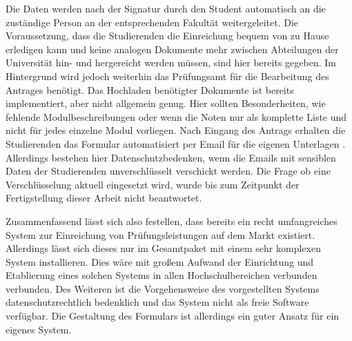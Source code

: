 Die Daten werden nach der Signatur durch den Student automatisch an die zuständige Person an der entsprechenden Fakultät weitergeleitet. Die Voraussetzung, dass die Studierenden die Einreichung bequem von zu Hause erledigen kann und keine analogen Dokumente mehr zwischen Abteilungen der Universität hin- und hergereicht werden müssen, sind hier bereits gegeben. Im Hintergrund wird jedoch weiterhin das Prüfungsamt für die Bearbeitung des Antrages benötigt. Das Hochladen benötigter Dokumente ist bereits implementiert, aber nicht allgemein genug. Hier sollten Besonderheiten, wie fehlende Modulbeschreibungen oder wenn die Noten nur als komplette Liste und nicht für jedes einzelne Modul vorliegen. Nach Eingang des Antrags erhalten die Studierenden das Formular automatisiert per Email für die eigenen Unterlagen \parencite{studit_formular}. Allerdings bestehen hier Datenschutzbedenken, wenn die Emails mit sensiblen Daten der Studierenden unverschlüsselt verschickt werden. Die Frage ob eine Verschlüsselung aktuell eingesetzt wird, wurde bis zum Zeitpunkt der Fertigstellung dieser Arbeit nicht beantwortet.

Zusammenfassend lässt sich also festellen, dass bereits ein recht umfangreiches System zur Einreichung von Prüfungsleistungen auf dem Markt existiert. Allerdings lässt sich dieses nur im Gesamtpaket mit einem sehr komplexen System installieren. Dies wäre mit großem Aufwand der Einrichtung und Etablierung eines solchen Systems in allen Hochschulbereichen verbunden verbunden. Des Weiteren ist die Vorgehensweise des vorgestellten Systems datenschutzrechtlich bedenklich und das System nicht als freie Software verfügbar. Die Gestaltung des Formulars ist allerdings ein guter Ansatz für ein eigenes System.
